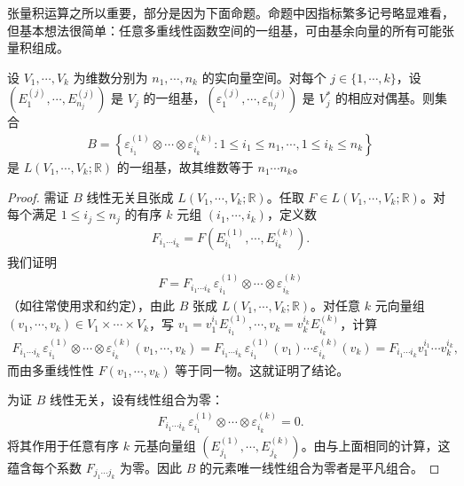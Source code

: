 \documentclass[../../main.tex]{subfiles}
\begin{document}
张量积运算之所以重要，部分是因为下面命题。命题中因指标繁多记号略显难看，但基本想法很简单：任意多重线性函数空间的一组基，可由基余向量的所有可能张量积组成。

\begin{proposition}[多重线性函数空间的一组基]\label{proposition:ch12-多重线性函数基}
设 $V_1,\cdots ,V_k$ 为维数分别为 $n_1,\cdots ,n_k$ 的实向量空间。对每个 $j\in\{1,\cdots ,k\}$，设 $(E^{(j)}_1,\cdots ,E^{(j)}_{n_j})$ 是 $V_j$ 的一组基，$(\varepsilon^{(j)}_1,\cdots ,\varepsilon^{(j)}_{n_j})$ 是 $V_j^*$ 的相应对偶基。则集合
\begin{align*}
B=\left\{\varepsilon^{(1)}_{i_1}\otimes\cdots\otimes\varepsilon^{(k)}_{i_k}:1\leqslant i_1\leqslant n_1,\cdots ,1\leqslant i_k\leqslant n_k\right\}
\end{align*}
是 $L(V_1,\cdots ,V_k;\mathbb{R})$ 的一组基，故其维数等于 $n_1\cdots n_k$。
\end{proposition}

\begin{proof}
需证 $B$ 线性无关且张成 $L(V_1,\cdots ,V_k;\mathbb{R})$。任取 $F\in L(V_1,\cdots ,V_k;\mathbb{R})$。对每个满足 $1\leqslant i_j\leqslant n_j$ 的有序 $k$ 元组 $(i_1,\cdots ,i_k)$，定义数
\begin{align}
F_{i_1\cdots  i_k}=F(E^{(1)}_{i_1},\cdots ,E^{(k)}_{i_k}).\label{align:ch12-分量}
\end{align}
我们证明
\begin{align*}
F=F_{i_1\cdots  i_k}\,\varepsilon^{(1)}_{i_1}\otimes\cdots\otimes\varepsilon^{(k)}_{i_k}
\end{align*}
（如往常使用求和约定），由此 $B$ 张成 $L(V_1,\cdots ,V_k;\mathbb{R})$。对任意 $k$ 元向量组 $(v_1,\cdots ,v_k)\in V_1\times\cdots\times V_k$，写 $v_1=v^{i_1}_1 E^{(1)}_{i_1},\cdots ,v_k=v^{i_k}_k E^{(k)}_{i_k}$，计算
\begin{align*}
F_{i_1\cdots  i_k}\,\varepsilon^{(1)}_{i_1}\otimes\cdots\otimes\varepsilon^{(k)}_{i_k}(v_1,\cdots ,v_k)
=F_{i_1\cdots  i_k}\,\varepsilon^{(1)}_{i_1}(v_1)\cdots\varepsilon^{(k)}_{i_k}(v_k)
=F_{i_1\cdots  i_k}v^{i_1}_1\cdots v^{i_k}_k,
\end{align*}
而由多重线性性 $F(v_1,\cdots ,v_k)$ 等于同一物。这就证明了结论。

为证 $B$ 线性无关，设有线性组合为零：
\begin{align*}
F_{i_1\cdots  i_k}\,\varepsilon^{(1)}_{i_1}\otimes\cdots\otimes\varepsilon^{(k)}_{i_k}=0.
\end{align*}
将其作用于任意有序 $k$ 元基向量组 $(E^{(1)}_{j_1},\cdots ,E^{(k)}_{j_k})$。由与上面相同的计算，这蕴含每个系数 $F_{j_1\cdots  j_k}$ 为零。因此 $B$ 的元素唯一线性组合为零者是平凡组合。
\end{proof}
\end{document}
